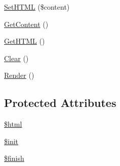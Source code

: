\begin{DoxyCompactItemize}
\item 
\hyperlink{class_h_t_m_l_element_a254daefab61356a01c67594c1a94b3b0}{Set\-H\-T\-M\-L} (\$content)
\item 
\hyperlink{class_h_t_m_l_element_ac9f196011988c5ae428ebd5127da8d71}{Get\-Content} ()
\item 
\hyperlink{class_h_t_m_l_element_abc99f9ea27a455eed49d783d5e03c4ad}{Get\-H\-T\-M\-L} ()
\item 
\hyperlink{class_h_t_m_l_element_a9258662f7f9ab8c3b67f4fc7b7611105}{Clear} ()
\item 
\hyperlink{class_h_t_m_l_element_a1a6915de89093bc6383d7c1f18ab81e2}{Render} ()
\end{DoxyCompactItemize}
\subsection*{Protected Attributes}
\begin{DoxyCompactItemize}
\item 
\hyperlink{class_h_t_m_l_element_a6f96e7fc92441776c9d1cd3386663b40}{\$html}
\item 
\hyperlink{class_h_t_m_l_element_a8834b0851b05d161c207a7d2e5dca9bd}{\$init}
\item 
\hyperlink{class_h_t_m_l_element_a63f4f7fe2d310cedeb87d58bd4e45ada}{\$finish}
\end{DoxyCompactItemize}


